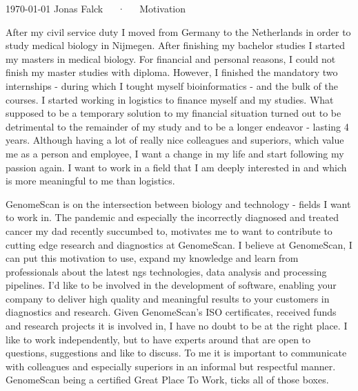 \documentclass[11pt, a4paper]{awesome-cv}
\begin{document}
\makecvheader[R]

\makecvfooter
  {\today}
  {Jonas Falck~~~·~~~Motivation}
  {}

\makelettertitle

\begin{cvletter}

After my civil service duty I moved from Germany to the Netherlands in order to study medical biology in Nijmegen. After finishing my bachelor studies I started my masters in medical biology.
For financial and personal reasons, I could not finish my master studies with diploma.
However, I finished the mandatory two internships - during which I tought myself bioinformatics - and the bulk of the courses.
I started working in logistics to finance myself and my studies.
What supposed to be a temporary solution to my financial situation turned out to be detrimental to the remainder of my study and to be a longer endeavor - lasting 4 years.
Although having a lot of really nice colleagues and superiors, which value me as a person and employee, I want a change in my life and start following my passion again.
I want to work in a field that I am deeply interested in and which is more meaningful to me than logistics.

GenomeScan is on the intersection between biology and technology - fields I want to work in.
The pandemic and especially the incorrectly diagnosed and treated cancer my dad recently succumbed to, motivates me to want to contribute to cutting edge research and diagnostics at GenomeScan.
I believe at GenomeScan, I can put this motivation to use, expand my knowledge and learn from professionals about the latest ngs technologies, data analysis and processing pipelines.
I'd like to be involved in the development of software, enabling your company to deliver high quality and meaningful results to your customers in diagnostics and research.
Given GenomeScan's ISO certificates, received funds and research projects it is involved in, I have no doubt to be at the right place.
I like to work independently, but to have experts around that are open to questions, suggestions and like to discuss.
To me it is important to communicate with colleagues and especially superiors in an informal but respectful manner.
GenomeScan being a certified Great Place To Work, ticks all of those boxes.


\end{cvletter}
\end{document}
